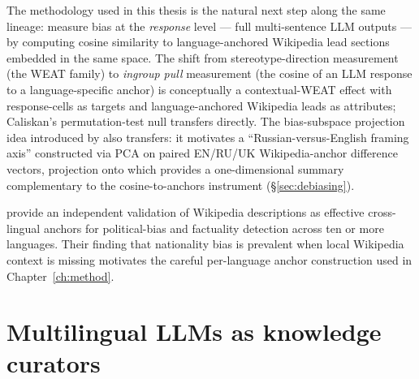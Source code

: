 The methodology used in this thesis is the natural next step along the
same lineage: measure bias at the \emph{response} level --- full
multi-sentence LLM outputs --- by computing cosine similarity to
language-anchored Wikipedia lead sections embedded in the same space.
The shift from stereotype-direction measurement (the WEAT family) to
\emph{ingroup pull} measurement (the cosine of an LLM response to a
language-specific anchor) is conceptually a contextual-WEAT effect with
response-cells as targets and language-anchored Wikipedia leads as
attributes; Caliskan's permutation-test null transfers directly. The
bias-subspace projection idea introduced by \citet{bolukbasi2016man}
also transfers: it motivates a ``Russian-versus-English framing axis''
constructed via PCA on paired EN/RU/UK Wikipedia-anchor difference
vectors, projection onto which provides a one-dimensional summary
complementary to the cosine-to-anchors instrument
(\S\ref{sec:debiasing}).

\citet{azizov2024safari} provide an independent validation of Wikipedia
descriptions as effective cross-lingual anchors for political-bias and
factuality detection across ten or more languages. Their finding that
nationality bias is prevalent when local Wikipedia context is missing
motivates the careful per-language anchor construction used in
Chapter~\ref{ch:method}.

\section{Multilingual LLMs as knowledge curators}\label{sec:llm_curators}

